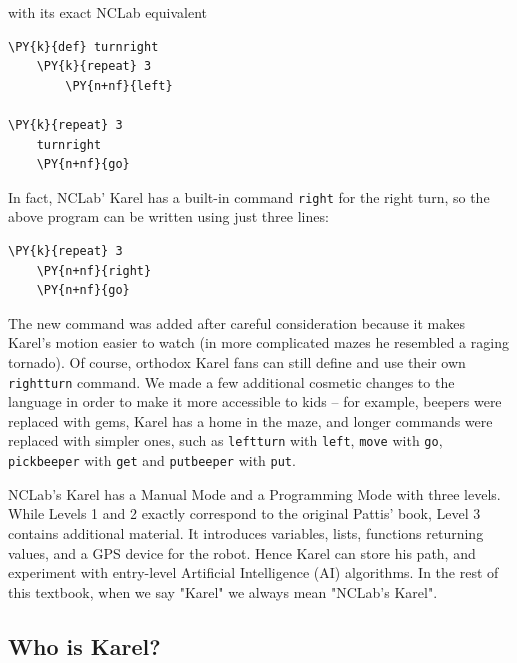 \noindent
with its exact NCLab equivalent\\

\begin{bbox}
\begin{Verbatim}[commandchars=\\\{\}]
\PY{k}{def} turnright
    \PY{k}{repeat} 3
        \PY{n+nf}{left}
 
\PY{k}{repeat} 3
    turnright
    \PY{n+nf}{go}
\end{Verbatim}
\end{bbox}
\vspace{6mm}

\noindent
In fact, NCLab' Karel has a built-in command {\tt right} for the
right turn, so the above program can be written using just three lines:\\

\begin{bbox}
\begin{Verbatim}[commandchars=\\\{\}]
\PY{k}{repeat} 3
    \PY{n+nf}{right}
    \PY{n+nf}{go}
\end{Verbatim}
\end{bbox}
\vspace{6mm}

\noindent
The new command was added after careful consideration because it makes Karel's motion 
easier to watch (in more complicated mazes he resembled a raging tornado).
Of course, orthodox Karel fans can still define and use their own {\tt rightturn} 
command. We made a few additional cosmetic changes to the language in order to make 
it more accessible to kids -- for example, beepers were replaced with gems, Karel 
has a home in the maze, and longer commands were replaced with simpler ones, such as 
{\tt leftturn} with {\tt left}, {\tt move} with {\tt go}, 
{\tt pickbeeper} with {\tt get} and {\tt putbeeper} with {\tt put}. 

NCLab's Karel has a Manual Mode and a Programming Mode with three levels. While Levels 
1 and 2 exactly correspond to the original Pattis' book, Level 3 contains 
additional material. It introduces variables, lists, functions returning 
values, and a GPS device for the robot. Hence Karel can store his path,
and experiment with entry-level Artificial Intelligence (AI) algorithms. 
In the rest of this textbook, when we say "Karel" we always mean "NCLab's Karel".

\subsection{Who is Karel?}

